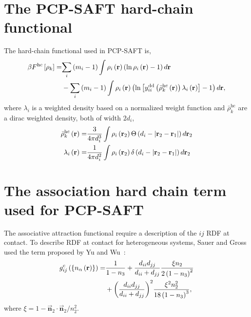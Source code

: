 \documentclass[12pt, letterpaper]{article}
\newcommand*{\vc}[1]{\vec{\mathbf{#1}}}%
\newcommand*{\abs}[1]{\lvert#1\rvert}
\newcommand*{\lb}{\ensuremath{\left(}}
\newcommand*{\rb}{\ensuremath{\right)}}
\newcommand*{\lbf}{\ensuremath{\left[}}
\newcommand*{\rbf}{\ensuremath{\right]}}
\newcommand{\contact}{\ensuremath{\text{c}}\xspace}
\newcommand{\hc}{\ensuremath{\text{hc}}\xspace}
\begin{document}
\section{The PCP-SAFT hard-chain functional}
The hard-chain functional used in PCP-SAFT \cite{sauer2017} is,
\begin{equation}
  \label{eq:hc_functional}
  \begin{split}
    \beta F^\hc\lbf \rho_{k} \rbf =& \underset{i}{\sum} \lb m_i - 1 \rb \int \rho_{i}\lb \mathbf{r}\rb \lb \ln \rho_{i}\lb \mathbf{r}\rb -1 \rb d\mathbf{r}\\
    & -\underset{i}{\sum} \lb m_i - 1 \rb \int \rho_{i}\lb \mathbf{r}\rb \lb \ln \lbf y_{ii}^{\text{dd}}\lb \bar{\rho}^\hc_{k}\lb\mathbf{r}\rb\rb\lambda_i\lb \mathbf{r} \rb\rbf -1 \rb d\mathbf{r},
    \end{split}
\end{equation}
where $\lambda_i$ is a weighted density based on a normalized weight
function and $\bar{\rho}^\hc_{k}$ are a dirac weighted density, both
of width $2 d_i$,
\begin{align}
  \label{eq:hc_densities}
  \bar{\rho}^\hc_{k}\lb\mathbf{r}\rb =& \frac{3}{4\pi d_i^3} \int \rho_{i}\lb \mathbf{r}_2\rb \Theta \lb d_i - \abs{\mathbf{r}_2 - \mathbf{r}_1}\rb d\mathbf{r}_2 \\
  \lambda_i\lb \mathbf{r} \rb  =& \frac{1}{4 \pi d_i^2} \int \rho_{i}\lb \mathbf{r}_2\rb \delta \lb d_i - \abs{\mathbf{r}_2 - \mathbf{r}_1}\rb d\mathbf{r}_2
\end{align}


\section{The association hard chain term used for PCP-SAFT}
The associative attraction functional require a description of the
$ij$ RDF at contact. To describe RDF at contact for heterogeneous
systems, Sauer and Gross used the term proposed by Yu and
Wu~\cite{yu2002}:
\begin{equation}
  \begin{split}
    g^{\contact}_{ij}\left(\left\{n_\alpha\left(\mathbf{r}\right)\right\}\right) =& \frac{1}{1- n_3} + \frac{d_{ii}d_{jj}}{d_{ii} + d_{jj}} \frac{\xi n_2}{2\lb 1- n_3 \rb^2} \\
                                                                                  &+ \biggl(\frac{d_{ii}d_{jj}}{d_{ii} + d_{jj}} \biggr)^2\frac{\xi^2n_2^2}{18\lb 1- n_3 \rb^3},
  \end{split}
\end{equation}
where $\xi = 1 - \vc{n}_2 \cdot \vc{n}_2 / n_2^2$.
\end{document}
